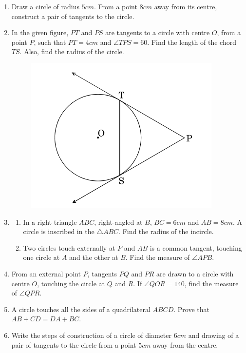 \documentclass{article}
\begin{document}
\begin{enumerate}
\begin{figure}[H]
			\caption{}
			\label{fig:my_label}
		\end{figure}
	\item Draw a circle of radius $5 cm$. From a point $8 cm$ away from its centre, construct a pair of tangents to the circle.
	\item In the given figure, $PT$ and $PS$ are tangents to a circle with centre $O$, from a point $P$, such that $PT = 4 cm$ and $\angle TPS = 60$\degree. Find the length of the chord $TS$. Also, find the radius of the circle.
		\begin{figure}[H]
			\centering
			\includegraphics[width=\columnwidth]{fig3.png}
			\caption{}
			\label{fig:my_label}
		\end{figure}
	\item \begin{enumerate}[label=(\alph*)]
			\item In a right triangle $ABC$, right-angled at $B$, $BC = 6 cm$ and $AB = 8 cm$. A circle is inscribed in the $\triangle ABC$. Find the radius of the incircle.
			\item Two circles touch externally at $P$ and $AB$ is a common tangent, touching one circle at $A$ and the other at $B$. Find the measure of $\angle APB$.
		\end{enumerate}
	\item From an external point $P$, tangents $PQ$ and $PR$ are drawn to a circle with centre $O$, touching the circle at $Q$ and $R$. If $\angle QOR = 140$\degree, find the measure of $\angle QPR$.
	\item A circle touches all the sides of a quadrilateral $ABCD$. Prove that $AB + CD = DA + BC$.
	\item Write the steps of construction of a circle of diameter $6 cm$ and drawing of a pair of tangents to the circle from a point $5 cm$ away from the centre.
\end{enumerate}
\end{document}
